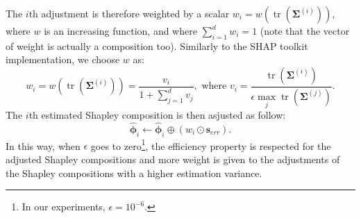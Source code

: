 \documentclass{article}
\theoremstyle{plain}
\theoremstyle{definition}
\theoremstyle{remark}
\DeclareMathOperator{\tr}{tr}
\begin{document}
The $i$th adjustment is therefore weighted by a scalar $w_i = w\left(\tr\left(\bm{\Sigma}^{(i)}\right)\right)$, where $w$ is an increasing function, and where $\displaystyle \sum_{i=1}^d w_i= 1$ (note that the vector of weight is actually a composition too). Similarly to the SHAP toolkit implementation, we choose $w$ as:
\begin{equation}
  w_i = w\left(\tr\left(\bm{\Sigma}^{(i)}\right)\right) = \frac{v_i}{\displaystyle 1+\sum_{j=1}^{d}v_j},\text{ where } v_i = \frac{\tr\left(\bm{\Sigma}^{(i)}\right)}{\displaystyle \epsilon \max_j \tr\left(\bm{\Sigma}^{(j)}\right)}.
\end{equation}
The $i$th estimated Shapley composition is then asjusted as follow:
\begin{equation}
  \hat{\bm{\phi}}_i \leftarrow \hat{\bm{\phi}}_i \oplus \left( w_i \odot \bm{s}_{err}\right).
\end{equation}
In this way, when $\epsilon$ goes to zero\footnote{In our experiments, $\epsilon = 10^{-6}$.}, the efficiency property is respected for the adjusted Shapley compositions and more weight is given to the adjustments of the Shapley compositions with a higher estimation variance.
\end{document}
